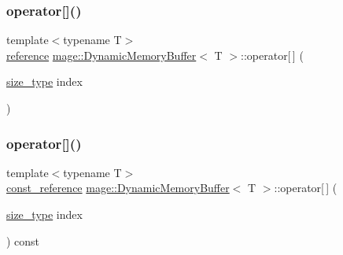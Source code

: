 \mbox{\label{classmage_1_1_dynamic_memory_buffer_a0b301053c19560b621f9005cabae4596}} 
\subsubsection{\texorpdfstring{operator[]()}{operator[]()}\hspace{0.1cm}{\footnotesize\ttfamily [1/2]}}
{\footnotesize\ttfamily template$<$typename T$>$ \\
\mbox{\hyperlink{classmage_1_1_dynamic_memory_buffer_a146681be5119c0329409436506334f05}{reference}} \mbox{\hyperlink{classmage_1_1_dynamic_memory_buffer}{mage\+::\+Dynamic\+Memory\+Buffer}}$<$ T $>$\+::operator\mbox{[}$\,$\mbox{]} (\begin{DoxyParamCaption}\item[{\mbox{\hyperlink{classmage_1_1_dynamic_memory_buffer_a45d02825da2b18fd7c24965ed5f46a30}{size\+\_\+type}}}]{index }\end{DoxyParamCaption})\hspace{0.3cm}{\ttfamily [noexcept]}}

\mbox{\label{classmage_1_1_dynamic_memory_buffer_abca35ce297de7c1c2e1f007024886c93}} 
\subsubsection{\texorpdfstring{operator[]()}{operator[]()}\hspace{0.1cm}{\footnotesize\ttfamily [2/2]}}
{\footnotesize\ttfamily template$<$typename T$>$ \\
\mbox{\hyperlink{classmage_1_1_dynamic_memory_buffer_aa454489303e19392c54044d3b3ae67ad}{const\+\_\+reference}} \mbox{\hyperlink{classmage_1_1_dynamic_memory_buffer}{mage\+::\+Dynamic\+Memory\+Buffer}}$<$ T $>$\+::operator\mbox{[}$\,$\mbox{]} (\begin{DoxyParamCaption}\item[{\mbox{\hyperlink{classmage_1_1_dynamic_memory_buffer_a45d02825da2b18fd7c24965ed5f46a30}{size\+\_\+type}}}]{index }\end{DoxyParamCaption}) const\hspace{0.3cm}{\ttfamily [noexcept]}}

